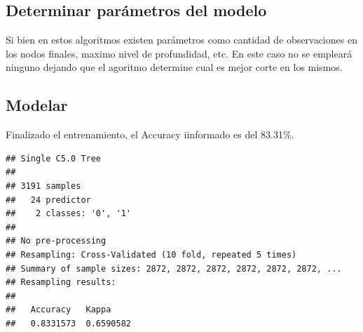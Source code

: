 \documentclass[]{article}
\begin{document}
\hypertarget{determinar-paruxe1metros-del-modelo}{%
\subsection{Determinar parámetros del
modelo}\label{determinar-paruxe1metros-del-modelo}}

Si bien en estos algoritmos existen parámetros como cantidad de
observaciones en los nodos finales, maximo nivel de profundidad, etc. En
este caso no se empleará ninguno dejando que el agoritmo determine cual
es mejor corte en los mismos.

\hypertarget{modelar-4}{%
\subsection{Modelar}\label{modelar-4}}

Finalizado el entrenamiento, el Accuracy iinformado es del 83.31\%.

\begin{lstlisting}
## Single C5.0 Tree 
## 
## 3191 samples
##   24 predictor
##    2 classes: '0', '1' 
## 
## No pre-processing
## Resampling: Cross-Validated (10 fold, repeated 5 times) 
## Summary of sample sizes: 2872, 2872, 2872, 2872, 2872, 2872, ... 
## Resampling results:
## 
##   Accuracy   Kappa    
##   0.8331573  0.6590582
\end{lstlisting}
\end{document}
